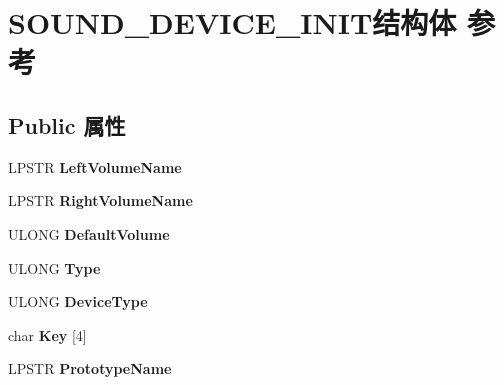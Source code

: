 \hypertarget{struct_s_o_u_n_d___d_e_v_i_c_e___i_n_i_t}{}\section{S\+O\+U\+N\+D\+\_\+\+D\+E\+V\+I\+C\+E\+\_\+\+I\+N\+I\+T结构体 参考}
\label{struct_s_o_u_n_d___d_e_v_i_c_e___i_n_i_t}
\subsection*{Public 属性}
\begin{DoxyCompactItemize}
\item 
\mbox{\label{struct_s_o_u_n_d___d_e_v_i_c_e___i_n_i_t_a15aa4703a092f245306a7a20460090c4}} 
L\+P\+S\+TR {\bfseries Left\+Volume\+Name}
\item 
\mbox{\label{struct_s_o_u_n_d___d_e_v_i_c_e___i_n_i_t_a92e83ffdd8d4622b1ac7c9f984334df2}} 
L\+P\+S\+TR {\bfseries Right\+Volume\+Name}
\item 
\mbox{\label{struct_s_o_u_n_d___d_e_v_i_c_e___i_n_i_t_a9cef6f9b8f62efe9cc728ade43371d11}} 
U\+L\+O\+NG {\bfseries Default\+Volume}
\item 
\mbox{\label{struct_s_o_u_n_d___d_e_v_i_c_e___i_n_i_t_afb1ddf7ad60a0e4d53d8f98b24896933}} 
U\+L\+O\+NG {\bfseries Type}
\item 
\mbox{\label{struct_s_o_u_n_d___d_e_v_i_c_e___i_n_i_t_aa850276f91d0f7957a6044104ca7b393}} 
U\+L\+O\+NG {\bfseries Device\+Type}
\item 
\mbox{\label{struct_s_o_u_n_d___d_e_v_i_c_e___i_n_i_t_a624f2c21ff30f40fde260bf99a94809c}} 
char {\bfseries Key} \mbox{[}4\mbox{]}
\item 
\mbox{\label{struct_s_o_u_n_d___d_e_v_i_c_e___i_n_i_t_a856cf26cc6580960a63a4f43a3ba3331}} 
L\+P\+S\+TR {\bfseries Prototype\+Name}
\item 

\end{DoxyCompactItemize}
